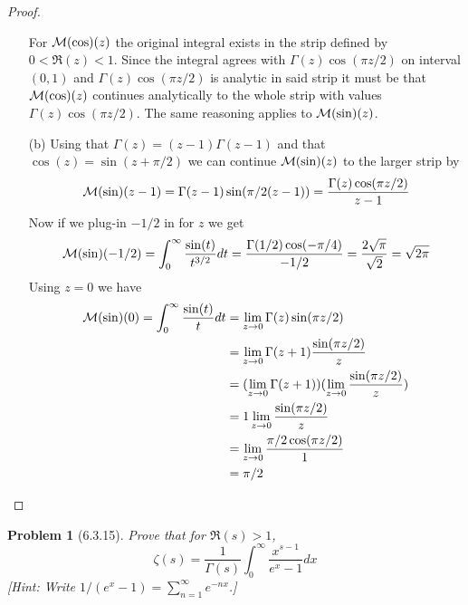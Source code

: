 \documentclass[10pt]{article}
\newcommand{\sk}{\vskip 10mm}
\theoremstyle{plain}
\newtheorem{problem}{Problem}
\theoremstyle{remark}
\begin{document}
\begin{proof}
\begin{enumerate}
    
    For ${\cal M}(\cos)(z)$ the original integral exists in the strip defined
    by $0<\Re(z)<1$. Since the integral agrees with $\Gamma(z)\cos(\pi z/2)$ on
    interval $(0,1)$ and $\Gamma(z)\cos(\pi z/2)$ is analytic in said strip it
    must be that ${\cal M}(\cos)(z)$ continues analytically to the whole
    strip with values $\Gamma(z)\cos(\pi z/2)$. The same reasoning applies
    to ${\cal M}(\sin)(z)$.
  \item[(b)] Using that $\Gamma(z)=(z-1)\Gamma(z-1)$ and that $\cos(z)=\sin(z+\pi/2)$
    we can continue ${\cal M}(\sin)(z)$ to the larger strip by
    \[
      {\cal M}(\sin)(z-1)=\Gamma(z-1)\sin(\pi/2(z-1))=\frac{\Gamma(z)\cos(\pi z/2)}{z-1}
    \]
    Now if we plug-in $-1/2$ in for $z$ we get
    \[
      {\cal M}(\sin)(-1/2)=\int_0^\infty \frac{\sin(t)}{t^{3/2}}dt = \frac{\Gamma(1/2)\cos(-\pi/4)}{-1/2}=\frac{2\sqrt{\pi}}{\sqrt{2}}=\sqrt{2\pi}
    \]
    Using $z=0$ we have
    \begin{align*}
      {\cal M}(\sin)(0)=\int_0^\infty\frac{\sin(t)}{t}dt &= \lim_{z\rightarrow 0}\Gamma(z)\sin(\pi z/2)\\
                                                 &= \lim_{z\rightarrow 0}\Gamma(z+1)\frac{\sin(\pi z/2)}{z}\\
                                                 &=(\lim_{z\rightarrow 0}\Gamma(z+1))(\lim_{z\rightarrow 0}\frac{\sin(\pi z/2)}{z})\\
                                                 &=1\lim_{z\rightarrow 0}\frac{\sin(\pi z/2)}{z}\\
                                                 &=\lim_{z\rightarrow 0}\frac{\pi/2\cos(\pi z/2)}{1}\\
                                                 &=\pi/2
    \end{align*}
  \end{enumerate}
\end{proof}

\sk

\begin{problem}[6.3.15]
  Prove that for $\Re(s)>1$,
  \[
    \zeta(s)=\frac{1}{\Gamma(s)}\int_0^\infty\frac{x^{s-1}}{e^x-1}dx
  \]
  [Hint: Write $1/(e^x-1)=\sum_{n=1}^\infty e^{-nx}$.]
\end{problem}
\end{document}
